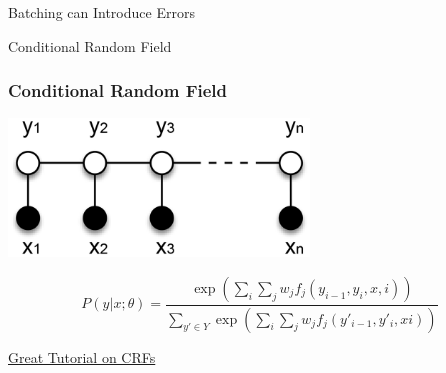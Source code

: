 \documentclass{beamer}
\begin{document}
\begin{section}{Batching can Introduce Errors}
    \begin{subsection}{Conditional Random Field}

        \begin{frame}
            \frametitle{Conditional Random Field}

            \begin{center}
                \includegraphics[width=0.6\textwidth]{images/crf.png}
            \end{center}
            $$
                P(y|x;\theta) = \frac{\exp(\sum_i \sum_j w_j f_j(y_{i-1}, y_i, x, i))}{\sum_{y' \in Y}\exp(\sum_i
                \sum_j w_j f_j(y'_{i - 1}, y'_i, x i))}
            $$
            \begin{center}
                \href{https://createmomo.github.io/2017/09/12/CRF_Layer_on_the_Top_of_BiLSTM_1/}{Great Tutorial on CRFs}
            \end{center}


\end{frame}
\end{subsection}
\end{section}
\end{document}
